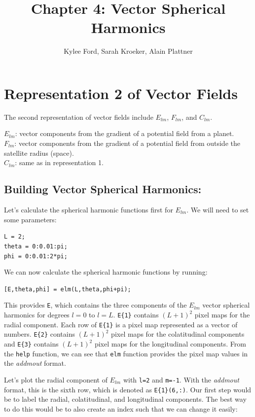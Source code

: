 \documentclass[11pt]{article}
\title{Chapter 4: Vector Spherical Harmonics}
\author{Kylee Ford, Sarah Kroeker, Alain Plattner}
\begin{document}
\maketitle

\section{Representation 2 of Vector Fields}

The second representation of vector fields include $E_{lm}$, $F_{lm}$, and $C_{lm}$.

$E_{lm}$: vector components from the gradient of a potential field from a planet. \\
$F_{lm}$: vector components from the gradient of a potential field from outside the satellite radius (space). \\
$C_{lm}$: same as in representation 1.

\subsection{Building Vector Spherical Harmonics:} 
Let's calculate the spherical harmonic functions first for $E_{lm}$.  We will need to set some parameters:

\verb|L = 2;|\\
\verb|theta = 0:0.01:pi;|\\
\verb|phi = 0:0.01:2*pi;|

We can now calculate the spherical harmonic functions by running:

\verb|[E,theta,phi] = elm(L,theta,phi+pi);|

This provides \verb|E|, which contains the three components of the $E_{lm}$ vector spherical harmonics for degrees $l=0$ to $l=L$.   \verb|E{1}| contains $(L+1)^2$ pixel maps for the radial component.  Each row of \verb|E{1}| is a pixel map represented as a vector of numbers.  \verb|E{2}| contains $(L+1)^2$ pixel maps for the colatitudinal components and \verb|E{3}| contains $(L+1)^2$ pixel maps for the longitudinal components.  From the \verb|help| function, we can see that \verb|elm| function provides the pixel map values in the \textit{addmout} format.  

Let's plot the radial component of $E_{lm}$ with \verb|l=2| and \verb|m=-1|.  With the \textit{addmout} format, this is the sixth row, which is denoted as \verb|E{1}(6,:)|.  Our first step would be to label the radial, colatitudinal, and longitudinal components.  The best way to do this would be to also create an index such that we can change it easily:
\end{document}
